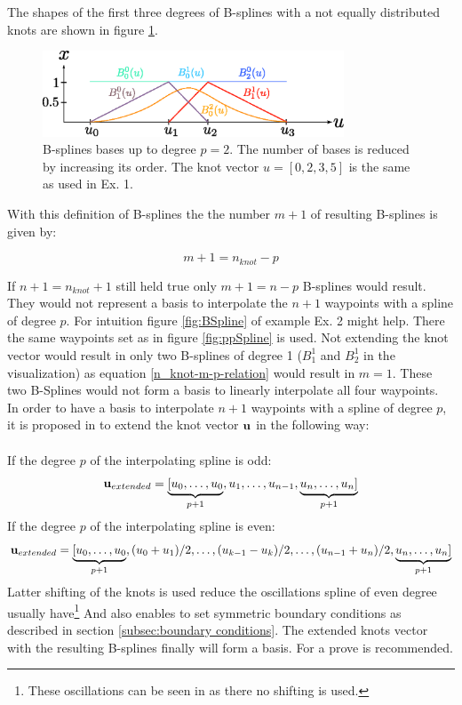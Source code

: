 The shapes of the first three degrees of B-splines with a not equally distributed knots are shown in figure \ref{fig:BSplines_definition}.

\begin{figure}[H]
	\centering
    \includegraphics[width = 0.8\textwidth]{graphics/BSplineBasis.eps}
  \caption{B-splines bases up to degree $p=2$. The number of bases is reduced by increasing its order. The knot vector $u=[0,2,3,5]$ is the same as used in Ex. 1.}
  \label{fig:BSplines_definition}
\end{figure} 

With this definition of B-splines the the number $m+1$ of resulting B-splines is given by:
 
\begin{equation}
\label{n_knot-m-p-relation}
m+1=n_{knot}-p
\end{equation} 

If $n+1=n_{knot}+1$ still held true only $m+1=n-p$ B-splines would result. They would not represent a basis to interpolate the $n+1$ waypoints with a spline of degree $p$. For intuition figure \ref{fig:BSpline} of example  Ex. 2 might help. There the same waypoints set as in figure \ref{fig:ppSpline} is used. Not extending the knot vector would result in only two B-splines of degree 1 ($B_1^1$ and $B_2^1$ in the visualization) as equation \eqref{n_knot-m-p-relation} would result in $m=1$. These two B-Splines would not form a basis to linearly interpolate all four waypoints. \\
In order to have a basis to interpolate $n+1$ waypoints with a spline of degree $p$, it is proposed in \cite{biagiotti} to extend the knot vector ${\bf u}$ in the following way:\\
\\
If the degree $p$ of the interpolating spline is odd:
\begin{equation}
{\bf u}_{extended}= \underbrace{ [u_0,\ldots,u_0}_{p+1},u_1, \ldots,u_{n-1},\underbrace{u_n,\ldots, u_n ]}_{p+1} 
\end{equation}
If the degree $p$ of the interpolating spline is even:
\begin{equation}
{\bf u}_{extended}= \underbrace{ [u_0,\ldots,u_0}_{p+1},(u_0+u_1)/2, \ldots, (u_{k-1}-u_k)/2, \ldots,(u_{n-1}+u_n)/2,\underbrace{u_n,\ldots, u_n ]}_{p+1} 
\end{equation} 
Latter shifting of the knots is used reduce the oscillations spline of even degree usually have\footnote{These oscillations can be seen in \cite{doessegger} as there no shifting is used.} And also enables to set symmetric boundary conditions as described in section \ref{subsec:boundary conditions}. The extended knots vector with the resulting B-splines finally will form a basis. For a prove \cite{dahmen} is recommended.

